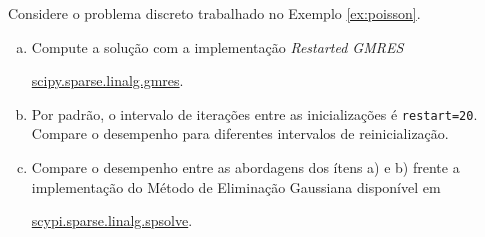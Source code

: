 \begin{exer}\label{exer:poisson_gmres}
  Considere o problema discreto trabalhado no Exemplo \ref{ex:poisson}.
  \begin{enumerate}[a)]
  \item Compute a solução com a implementação {\it Restarted GMRES}
    \begin{center}
\href{https://docs.scipy.org/doc/scipy/reference/generated/scipy.sparse.linalg.gmres.html}{scipy.sparse.linalg.gmres}.
\end{center}
  \item Por padrão, o intervalo de iterações entre as inicializações é \lstinline+restart=20+. Compare o desempenho para diferentes intervalos de reinicialização.
  \item Compare o desempenho entre as abordagens dos ítens a) e b) frente a implementação do Método de Eliminação Gaussiana disponível em
    \begin{center}
\href{https://docs.scipy.org/doc/scipy/reference/generated/scipy.sparse.linalg.spsolve.html#scipy.sparse.linalg.spsolve}{scypi.sparse.linalg.spsolve}.
\end{center}
  \end{enumerate}
\end{exer}

